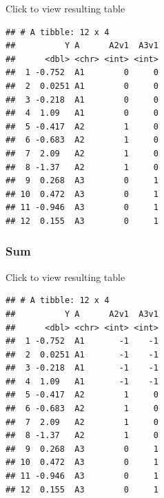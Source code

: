 \documentclass[]{book}
\newenvironment{Shaded}{\begin{snugshade}}{\end{snugshade}}
\newcommand{\CommentTok}[1]{\textcolor[rgb]{0.56,0.35,0.01}{\textit{#1}}}
\newcommand{\DataTypeTok}[1]{\textcolor[rgb]{0.13,0.29,0.53}{#1}}
\newcommand{\KeywordTok}[1]{\textcolor[rgb]{0.13,0.29,0.53}{\textbf{#1}}}
\newcommand{\NormalTok}[1]{#1}
\newcommand{\OperatorTok}[1]{\textcolor[rgb]{0.81,0.36,0.00}{\textbf{#1}}}
\newcommand{\OtherTok}[1]{\textcolor[rgb]{0.56,0.35,0.01}{#1}}
\newcommand{\StringTok}[1]{\textcolor[rgb]{0.31,0.60,0.02}{#1}}
\begin{document}
Click to view resulting table

\begin{verbatim}
## # A tibble: 12 x 4
##          Y A      A2v1  A3v1
##      <dbl> <chr> <int> <int>
##  1 -0.752  A1        0     0
##  2  0.0251 A1        0     0
##  3 -0.218  A1        0     0
##  4  1.09   A1        0     0
##  5 -0.417  A2        1     0
##  6 -0.683  A2        1     0
##  7  2.09   A2        1     0
##  8 -1.37   A2        1     0
##  9  0.268  A3        0     1
## 10  0.472  A3        0     1
## 11 -0.946  A3        0     1
## 12  0.155  A3        0     1
\end{verbatim}

\hypertarget{sum-2}{%
\subsubsection{Sum}\label{sum-2}}

\begin{Shaded}
\end{Shaded}

Click to view resulting table

\begin{verbatim}
## # A tibble: 12 x 4
##          Y A      A2v1  A3v1
##      <dbl> <chr> <int> <int>
##  1 -0.752  A1       -1    -1
##  2  0.0251 A1       -1    -1
##  3 -0.218  A1       -1    -1
##  4  1.09   A1       -1    -1
##  5 -0.417  A2        1     0
##  6 -0.683  A2        1     0
##  7  2.09   A2        1     0
##  8 -1.37   A2        1     0
##  9  0.268  A3        0     1
## 10  0.472  A3        0     1
## 11 -0.946  A3        0     1
## 12  0.155  A3        0     1
\end{verbatim}
\end{document}
